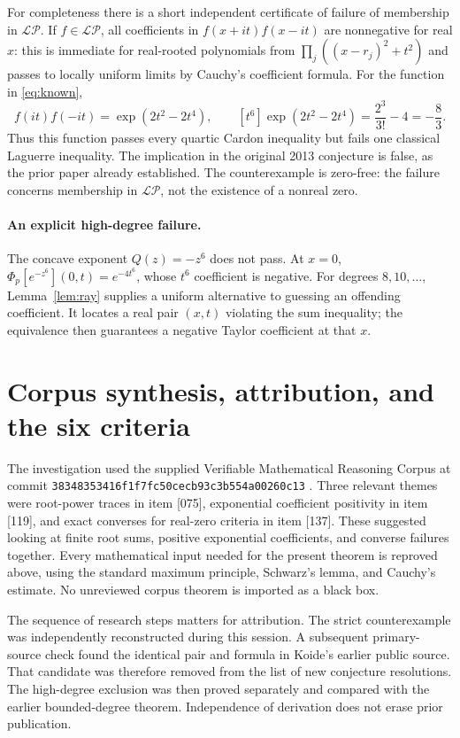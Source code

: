 \documentclass[11pt,a4paper]{article}
\theoremstyle{remark}\newtheorem{remark}[theorem]{Remark}
\newcommand{\LP}{\mathcal{LP}}
\newcommand{\Ph}{\Phi_p}
\begin{document}
For completeness there is a short independent certificate of failure
of membership in $\LP$. If $f\in\LP$, all coefficients in
$f(x+it)f(x-it)$ are nonnegative for real $x$: this is immediate for
real-rooted polynomials from
$\prod_j((x-r_j)^2+t^2)$ and passes to locally uniform limits by
Cauchy's coefficient formula. For the function in \eqref{eq:known},
\[
 f(it)f(-it)=\exp(2t^2-2t^4),\qquad
 [t^6]\exp(2t^2-2t^4)=\frac{2^3}{3!}-4=-\frac83.
\]
Thus this function passes every quartic Cardon inequality but fails
one classical Laguerre inequality. The implication in the original
2013 conjecture is false, as the prior paper already established.
The counterexample is zero-free: the failure concerns membership in
$\LP$, not the existence of a nonreal zero.

\paragraph{An explicit high-degree failure.}
The concave exponent $Q(z)=-z^6$ does not pass. At $x=0$,
$\Ph[e^{-z^6}](0,t)=e^{-4t^6}$, whose $t^6$ coefficient is negative.
For degrees $8,10,\ldots$, Lemma~\ref{lem:ray} supplies a uniform
alternative to guessing an offending coefficient. It locates a real
pair $(x,t)$ violating the sum inequality; the equivalence then
guarantees a negative Taylor coefficient at that $x$.

\section{Corpus synthesis, attribution, and the six criteria}

The investigation used the supplied Verifiable Mathematical Reasoning
Corpus at commit
\texttt{38348353416f1f7fc50cecb93c3b554a00260c13} \cite{VMRC}.
Three relevant themes were root-power traces in item [075], exponential
coefficient positivity in item [119], and exact converses for real-zero
criteria in item [137]. These suggested looking at finite root sums,
positive exponential coefficients, and converse failures together.
Every mathematical input needed for the present theorem is reproved
above, using the standard maximum principle, Schwarz's lemma, and
Cauchy's estimate. No unreviewed corpus
theorem is imported as a black box.

The sequence of research steps matters for attribution. The strict
counterexample was independently reconstructed during this session.
A subsequent primary-source check found the identical pair and formula
in Koide's earlier public source. That candidate was therefore removed
from the list of new conjecture resolutions. The high-degree exclusion
was then proved separately and compared with the earlier bounded-degree
theorem. Independence of derivation does not erase prior publication.
\end{document}

